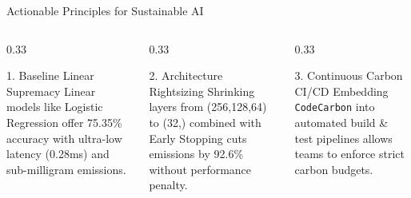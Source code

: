\documentclass[aspectratio=169, 10pt]{beamer}
\begin{document}
\begin{frame}{Actionable Principles for Sustainable AI}
    \begin{columns}
        \begin{column}{0.33\textwidth}
            \begin{block}{1. Baseline Linear Supremacy}
                \small
                Linear models like Logistic Regression offer 75.35\% accuracy with ultra-low latency (0.28ms) and sub-milligram emissions.
            \end{block}
        \end{column}
        
        \begin{column}{0.33\textwidth}
            \begin{block}{2. Architecture Rightsizing}
                \small
                Shrinking layers from (256,128,64) to (32,) combined with Early Stopping cuts emissions by 92.6\% without performance penalty.
            \end{block}
        \end{column}
        
        \begin{column}{0.33\textwidth}
            \begin{block}{3. Continuous Carbon CI/CD}
                \small
                Embedding \texttt{CodeCarbon} into automated build \& test pipelines allows teams to enforce strict carbon budgets.
            \end{block}
        \end{column}
    \end{columns}
\end{frame}
\end{document}
